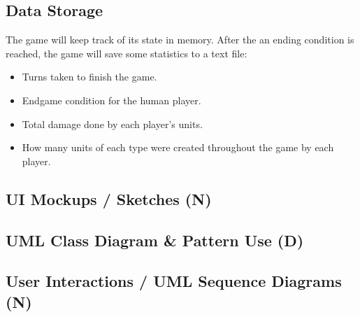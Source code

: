 \documentclass[11pt]{amsart}
\def \hwnum{5} %
\newif\ifcode %
\begin{document}
\subsection*{Data Storage} \phantom{}

The game will keep track of its state in memory. After the an ending condition is reached, the game will save some statistics to a text file:
\begin{itemize}
    \item Turns taken to finish the game.
    \item Endgame condition for the human player.
    \item Total damage done by each player's units.
    \item How many units of each type were created throughout the game by each player.
\end{itemize}

\subsection*{UI Mockups / Sketches (N)} \phantom{}
\subsection*{UML Class Diagram \& Pattern Use (D)} \phantom{}
\subsection*{User Interactions / UML Sequence Diagrams (N)} \phantom{}


\ifcode
    \newpage
    \section*{Code}
    \label{sec:code}
    
\fi


% 
\end{document}
